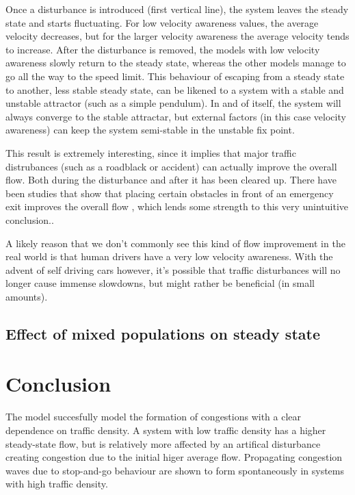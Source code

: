 \documentclass[11pt,a4paper,twocolumn]{article}
\begin{document}
Once a disturbance is introduced (first vertical line), the system leaves the steady state and starts fluctuating. For low velocity awareness values, the average velocity decreases, but for the larger velocity awareness the average velocity tends to increase.
After the disturbance is removed, the models with low velocity awareness slowly return to the steady state, whereas the other models manage to go all the way to the speed limit. This behaviour of escaping from a steady state to another, less stable steady state, can be likened to a system with a stable and unstable attractor (such as a simple pendulum). In and of itself, the system will always converge to the stable attractar, but external factors (in this case velocity awareness) can keep the system semi-stable in the unstable fix point.

This result is extremely interesting, since it implies that major traffic distrubances (such as a roadblack or accident) can actually improve the overall flow. Both during the disturbance and after it has been cleared up.
There have been studies that show that placing certain obstacles in front of an emergency exit improves the overall flow \cite{yanagisawa2009obstacle}, which lends some strength to this very unintuitive conclusion..

A likely reason that we don't commonly see this kind of flow improvement in the real world is that human drivers have a very low velocity awareness. With the advent of self driving cars however, it's possible that traffic disturbances  will no longer cause immense slowdowns, but might rather be beneficial (in small amounts).

\subsection{Effect of mixed populations on steady state}


\FloatBarrier
\section{Conclusion}
The model succesfully model the formation of congestions with a clear dependence on traffic density. A system with low traffic density has a higher steady-state flow, but is relatively more affected by an artifical disturbance creating congestion due to the initial higer average flow. Propagating congestion waves due to stop-and-go behaviour are shown to form spontaneously in systems with high traffic density. 
\end{document}
